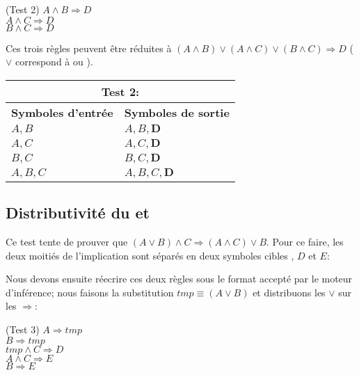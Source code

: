 \documentclass[12pt]{article}
\begin{document}
\begin{algorithm}
\BeginKB(Test 2\label{T2}){
  $A \land B \Rightarrow D$ \\
  $A \land C \Rightarrow D$ \\
  $B \land C \Rightarrow D$ \\
}
\end{algorithm}

Ces trois règles peuvent être réduites à $(A \land B) \lor (A \land C) \lor (B \land C) \Rightarrow D$ ($\lor$ correspond à \og ou \fg).

\begin{tabular}{|p{4cm}|p{6.5cm}|}
  \hline
  \multicolumn{2}{|c|}{\textbf{Test 2:}} \\
  \hline
  \textbf{Symboles d'entrée} & \textbf{Symboles de sortie} \\
  \hline
  $A, B$ & $A, B, \mathbf{D}$ \\
  \hline
  $A, C$ & $A, C, \mathbf{D}$ \\
  \hline
  $B, C$ & $B, C, \mathbf{D}$ \\
  \hline
  $A, B, C$ & $A, B, C, \mathbf{D}$ \\
  \hline
\end{tabular}

\subsection{Distributivité du \og et \fg}

Ce test tente de prouver que $(A \lor B) \land C \Rightarrow (A \land C) \lor B$.
Pour ce faire, les deux moitiés de l'implication sont séparés en deux symboles \og cibles \fg, $D$ et $E$:

\begin{algorithm}
\end{algorithm}

Nous devons ensuite réecrire ces deux règles sous le format accepté par le moteur d'inférence; nous faisons la substitution $tmp \equiv (A \lor B)$ et distribuons les $\lor$ sur les $\Rightarrow$:

\begin{algorithm}
\BeginKB(Test 3\label{T3}){
  $A \Rightarrow tmp$ \\
  $B \Rightarrow tmp$ \\
  $tmp \land C \Rightarrow D$ \\

  $A \land C \Rightarrow E$ \\
  $B \Rightarrow E$
}
\end{algorithm}
\end{document}
